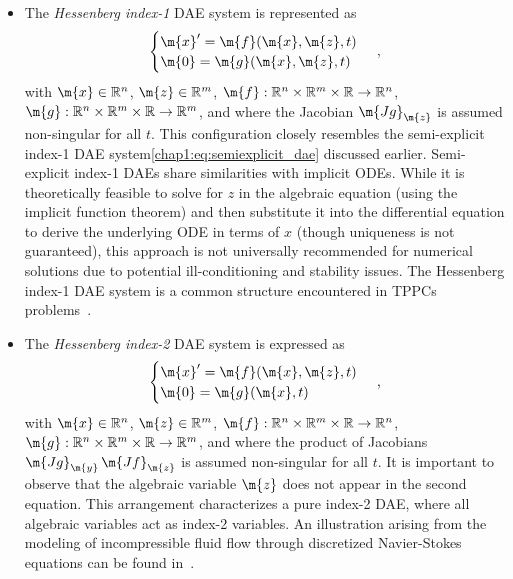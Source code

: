 \begin{itemize}
  \setlength\itemsep{0.0em}
  \item The \emph{Hessenberg index-1} \ac{DAE} system is represented as
  \begin{equation*}
    \begin{cases}
      \m{x}^{\prime} = \m{f}(\m{x}, \m{z}, t) \\
      \m{0} = \m{g}(\m{x}, \m{z}, t)
    \end{cases} \, \text{,}
  \end{equation*}
  with $\m{x} \in \mathbb{R}^n$, $\m{z} \in \mathbb{R}^m$, $\m{f}: \mathbb{R}^{n} \times \mathbb{R}^{m} \times \mathbb{R} \rightarrow \mathbb{R}^{n}$, $\m{g}: \mathbb{R}^{n} \times \mathbb{R}^{m} \times \mathbb{R} \rightarrow \mathbb{R}^{m}$, and where the Jacobian $\m{Jg}_\m{z}$ is assumed non-singular for all $t$. This configuration closely resembles the semi-explicit index-1 \ac{DAE} system\eqref{chap1:eq:semiexplicit_dae} discussed earlier. Semi-explicit index-1 \acp{DAE} share similarities with implicit \acp{ODE}. While it is theoretically feasible to solve for $z$ in the algebraic equation (using the implicit function theorem) and then substitute it into the differential equation to derive the underlying \ac{ODE} in terms of $x$ (though uniqueness is not guaranteed), this approach is not universally recommended for numerical solutions due to potential ill-conditioning and stability issues. The Hessenberg index-1 \ac{DAE} system is a common structure encountered in \acp{TPPC} problems~\cite{brenan1995numerical}.
  \item The \emph{Hessenberg index-2} \ac{DAE} system is expressed as
  \begin{equation*}
    \begin{cases}
      \m{x}^{\prime} = \m{f}(\m{x}, \m{z}, t) \\
      \m{0} = \m{g}(\m{x}, t)
    \end{cases} \, \text{,}
  \end{equation*}
  with $\m{x} \in \mathbb{R}^n$, $\m{z} \in \mathbb{R}^m$, $\m{f}: \mathbb{R}^{n} \times \mathbb{R}^{m} \times \mathbb{R} \rightarrow \mathbb{R}^{n}$, $\m{g}: \mathbb{R}^{n} \times \mathbb{R}^{m} \times \mathbb{R} \rightarrow \mathbb{R}^{m}$, and where the product of Jacobians $\m{Jg}_\m{y} \, \m{Jf}_\m{z}$ is assumed non-singular for all $t$. It is important to observe that the algebraic variable $\m{z}$ does not appear in the second equation. This arrangement characterizes a pure index-2 \ac{DAE}, where all algebraic variables act as index-2 variables. An illustration arising from the modeling of incompressible fluid flow through discretized Navier-Stokes equations can be found in~\cite{ascher1998computer}.

\end{itemize}
